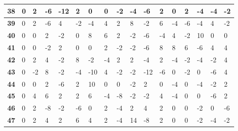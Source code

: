 \begin{longtable}[c]{|l|l|l|l|l|l|l|l|l|l|l|l|l|l|l|l|l|}
\textbf{38} & 0          & 2          & -6         & -12        & 2          & 0          & 0          & -2         & -4         & -6         & 2           & 0           & 2           & -4          & -4          & -2          \\ \hline
\textbf{39} & 0          & 2          & -6         & 4          & -2         & -4         & 4          & 2          & 8          & -2         & 6           & -4          & -6          & -4          & 4           & -2          \\ \hline
\textbf{40} & 0          & 0          & 2          & -2         & 0          & 8          & 6          & 2          & -2         & -6         & -4          & 4           & -2          & 10          & 0           & 0           \\ \hline
\textbf{41} & 0          & 0          & -2         & 2          & 0          & 0          & 2          & -2         & -2         & -6         & 8           & 8           & 6           & -6          & 4           & 4           \\ \hline
\textbf{42} & 0          & 2          & 4          & -2         & 8          & -2         & -4         & 2          & 2          & -4         & 2           & -4          & -2          & -4          & -2          & 4           \\ \hline
\textbf{43} & 0          & -2         & 8          & -2         & -4         & -10        & 4          & -2         & -2         & -12        & -6          & 0           & -2          & 0           & -6          & 4           \\ \hline
\textbf{44} & 0          & 0          & 2          & -6         & 2          & 10         & 0          & 0          & -2         & 2          & 0           & -4          & 0           & -4          & -2          & 2           \\ \hline
\textbf{45} & 0          & 4          & 6          & 2          & 2          & 6          & -4         & -8         & -2         & -2         & 4           & -4          & 0           & 0           & -6          & 2           \\ \hline
\textbf{46} & 0          & 2          & -8         & -2         & -6         & 0          & 2          & -4         & 2          & 4          & 2           & 0           & 0           & -2          & 0           & -6          \\ \hline
\textbf{47} & 0          & 2          & 4          & 2          & 6          & 4          & 2          & -4         & 14         & -8         & 2           & 0           & 0           & -2          & -4          & -2          \\ \hline

\end{longtable}
